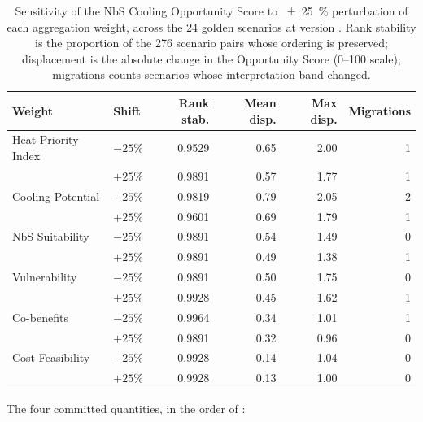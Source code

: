 \begin{table}[H]
\centering
\caption[Sensitivity analysis results]{Sensitivity of the NbS Cooling
Opportunity Score to \SI{\pm 25}{\percent} perturbation of each aggregation
weight, across the \num{24} golden scenarios at version \methver{}. Rank
stability is the proportion of the \num{276} scenario pairs whose ordering is
preserved; displacement is the absolute change in the Opportunity Score
(0--100 scale); migrations counts scenarios whose interpretation band changed.}
\label{tab:sensitivity-results}
\small
\begin{tabular}{@{}llrrrr@{}}
\toprule
\textbf{Weight} & \textbf{Shift} & \textbf{Rank stab.} &
\textbf{Mean disp.} & \textbf{Max disp.} & \textbf{Migrations} \\
\midrule
Heat Priority Index & $-25\%$ & 0.9529 & 0.65 & 2.00 & 1 \\
                    & $+25\%$ & 0.9891 & 0.57 & 1.77 & 1 \\
Cooling Potential   & $-25\%$ & 0.9819 & 0.79 & 2.05 & 2 \\
                    & $+25\%$ & 0.9601 & 0.69 & 1.79 & 1 \\
NbS Suitability     & $-25\%$ & 0.9891 & 0.54 & 1.49 & 0 \\
                    & $+25\%$ & 0.9891 & 0.49 & 1.38 & 1 \\
Vulnerability       & $-25\%$ & 0.9891 & 0.50 & 1.75 & 0 \\
                    & $+25\%$ & 0.9928 & 0.45 & 1.62 & 1 \\
Co-benefits         & $-25\%$ & 0.9964 & 0.34 & 1.01 & 1 \\
                    & $+25\%$ & 0.9891 & 0.32 & 0.96 & 0 \\
Cost Feasibility    & $-25\%$ & 0.9928 & 0.14 & 1.04 & 0 \\
                    & $+25\%$ & 0.9928 & 0.13 & 1.00 & 0 \\
\bottomrule
\end{tabular}
\end{table}

The four committed quantities, in the order of :


